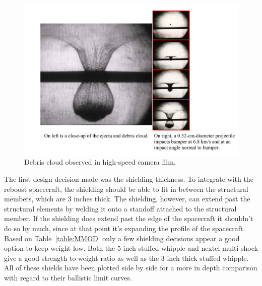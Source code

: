 \documentclass[paper=letter, fontsize=11pt]{scrartcl} %
\numberwithin{equation}{section} %
\numberwithin{figure}{section} %
\numberwithin{table}{section} %
\begin{document}
\begin{figure}[H]
    \begin{center}
        \includegraphics[width=5in]{plume.png}
        \caption{Debris cloud observed in high-speed camera film.}
        \label{fig:plume}
    \end{center}
\end{figure}

The first design decision made was the shielding thickness. To integrate with the reboost spacecraft, the shielding should be able to fit in between the structural members, which are 3 inches thick. The shielding, however, can extend past the structural elements by welding it onto a standoff attached to the structural member. If the shielding does extend past the edge of the spacecraft it shouldn't do so by much, since at that point it's expanding the profile of the spacecraft. Based on Table~\ref{table:MMOD} only a few shielding decisions appear a good option to keep weight low. Both the 5 inch stuffed whipple and nextel multi-shock give a good strength to weight ratio as well as the 3 inch thick stuffed whipple. All of these shields have been plotted side by side for a more in depth comparison with regard to their ballistic limit curves.
\end{document}
